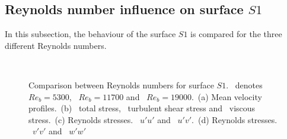 \subsection{Reynolds number influence on surface $S1$} \label{subsec: Reynolds comp S1}

In this subsection, the behaviour of the surface $S1$ is compared for the three different Reynolds numbers.
\begin{figure}
    \centering
    \begin{subfigure}{0.495\textwidth}
        \centering
        \subcaption{}
        
        \label{subfig: Reynolds comp S1 velocity}
    \end{subfigure}
    \hfill
    \begin{subfigure}{0.495\textwidth}
        \centering
        \subcaption{}
        
        \label{subfig: Reynolds comp S1 total stress}
    \end{subfigure}
    \plotverticalspacing
    \begin{subfigure}{0.495\textwidth}
        \centering
        \subcaption{}
        
        \label{subfig: Reynolds comp S1 Reynolds stresses uu}
    \end{subfigure}
    \hfill
    \begin{subfigure}{0.495\textwidth}
        \centering
        \subcaption{}
        
        \label{subfig: Reynolds comp S1 Reynolds stresses vv}
    \end{subfigure} 
    \\[-10pt]  
    \caption[Comparison of surface $S1$ with different Reynolds numbers]{Comparison between Reynolds numbers for surface $S1$.  \sOneFiveThreeSymbol\ denotes $Re_b = 5300$, \sOneElevenSevenSymbol \ $Re_b = 11700$ and \sOneNineteenSymbol\ $Re_b = 19000$.~(a) Mean velocity profiles.~(b) \lsTotalStressSymbol \ total stress, \lsReynoldsStressSymbol \ turbulent shear stress and \lsDispersiveStressSymbol \ viscous stress.~(c) Reynolds stresses. \lsRuuSymbol \ $u'u'$ and \lsRuvSymbol \ $u'v'$.~(d) Reynolds stresses. \lsRvvSymbol \ $v'v'$ and \lsRwwSymbol \ $w'w'$}
    \label{fig: results Reynolds comparison S1}
\end{figure}


